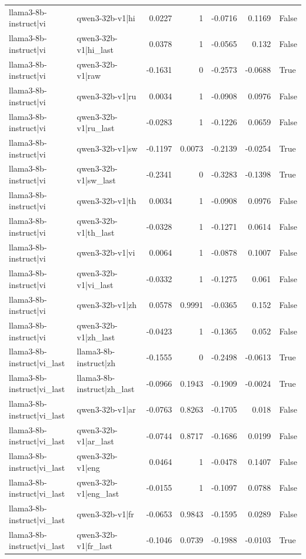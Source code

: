 \begin{table}
\begin{tabular}{l l r r r r l}
llama3-8b-instruct|vi & qwen3-32b-v1|hi & 0.0227 & 1 & -0.0716 & 0.1169 & False \\
llama3-8b-instruct|vi & qwen3-32b-v1|hi_last & 0.0378 & 1 & -0.0565 & 0.132 & False \\
llama3-8b-instruct|vi & qwen3-32b-v1|raw & -0.1631 & 0 & -0.2573 & -0.0688 & True \\
llama3-8b-instruct|vi & qwen3-32b-v1|ru & 0.0034 & 1 & -0.0908 & 0.0976 & False \\
llama3-8b-instruct|vi & qwen3-32b-v1|ru_last & -0.0283 & 1 & -0.1226 & 0.0659 & False \\
llama3-8b-instruct|vi & qwen3-32b-v1|sw & -0.1197 & 0.0073 & -0.2139 & -0.0254 & True \\
llama3-8b-instruct|vi & qwen3-32b-v1|sw_last & -0.2341 & 0 & -0.3283 & -0.1398 & True \\
llama3-8b-instruct|vi & qwen3-32b-v1|th & 0.0034 & 1 & -0.0908 & 0.0976 & False \\
llama3-8b-instruct|vi & qwen3-32b-v1|th_last & -0.0328 & 1 & -0.1271 & 0.0614 & False \\
llama3-8b-instruct|vi & qwen3-32b-v1|vi & 0.0064 & 1 & -0.0878 & 0.1007 & False \\
llama3-8b-instruct|vi & qwen3-32b-v1|vi_last & -0.0332 & 1 & -0.1275 & 0.061 & False \\
llama3-8b-instruct|vi & qwen3-32b-v1|zh & 0.0578 & 0.9991 & -0.0365 & 0.152 & False \\
llama3-8b-instruct|vi & qwen3-32b-v1|zh_last & -0.0423 & 1 & -0.1365 & 0.052 & False \\
llama3-8b-instruct|vi_last & llama3-8b-instruct|zh & -0.1555 & 0 & -0.2498 & -0.0613 & True \\
llama3-8b-instruct|vi_last & llama3-8b-instruct|zh_last & -0.0966 & 0.1943 & -0.1909 & -0.0024 & True \\
llama3-8b-instruct|vi_last & qwen3-32b-v1|ar & -0.0763 & 0.8263 & -0.1705 & 0.018 & False \\
llama3-8b-instruct|vi_last & qwen3-32b-v1|ar_last & -0.0744 & 0.8717 & -0.1686 & 0.0199 & False \\
llama3-8b-instruct|vi_last & qwen3-32b-v1|eng & 0.0464 & 1 & -0.0478 & 0.1407 & False \\
llama3-8b-instruct|vi_last & qwen3-32b-v1|eng_last & -0.0155 & 1 & -0.1097 & 0.0788 & False \\
llama3-8b-instruct|vi_last & qwen3-32b-v1|fr & -0.0653 & 0.9843 & -0.1595 & 0.0289 & False \\
llama3-8b-instruct|vi_last & qwen3-32b-v1|fr_last & -0.1046 & 0.0739 & -0.1988 & -0.0103 & True \\

\end{tabular}
\end{table}

